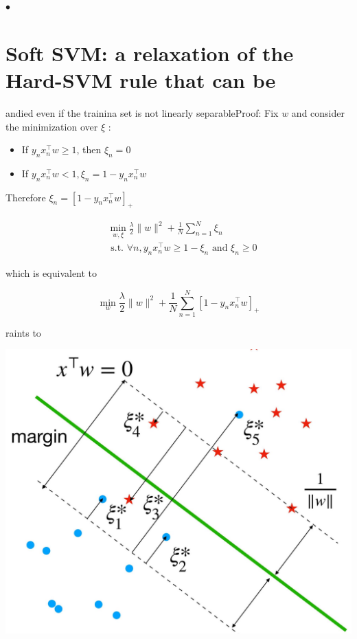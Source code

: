\documentclass[10pt]{article}
\begin{document}
$\bullet$

\section*{Soft SVM: a relaxation of the Hard-SVM rule that can be}
 andied even if the trainina set is not linearly separableProof: Fix $w$ and consider the minimization over $\xi$ :

\begin{itemize}
  \item If $y_{n} x_{n}^{\top} w \geq 1$, then $\xi_{n}=0$
  \item If $y_{n} x_{n}^{\top} w<1, \xi_{n}=1-y_{n} x_{n}^{\top} w$
\end{itemize}

Therefore $\xi_{n}=\left[1-y_{n} x_{n}^{\top} w\right]_{+}$

$$
\begin{aligned}
& \min _{w, \xi} \frac{\lambda}{2}\|w\|^{2}+\frac{1}{N} \sum_{n=1}^{N} \xi_{n} \\
& \text { s.t. } \forall n, y_{n} x_{n}^{\top} w \geq 1-\xi_{n} \text { and } \xi_{n} \geq 0
\end{aligned}
$$

which is equivalent to

$$
\min _{w} \frac{\lambda}{2}\|w\|^{2}+\frac{1}{N} \sum_{n=1}^{N}\left[1-y_{n} x_{n}^{\top} w\right]_{+}
$$

raints to

\begin{center}
\includegraphics[max width=\textwidth]{2023_12_30_bf5d191916c1e78fa6d6g-10}
\end{center}
\end{document}
